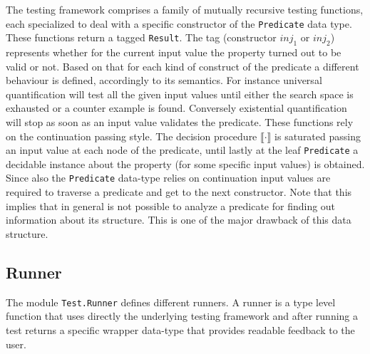 \documentclass[10pt,a4paper]{article}
\begin{document}
The testing framework comprises a family of mutually recursive testing functions, each specialized to deal with a specific constructor of the \texttt{Predicate} data type. These functions return a tagged \texttt{Result}.
The tag (constructor $inj_1$ or $inj_2$) represents whether for the current input value the property turned out to be valid or not.
Based on that for each kind of construct of the predicate a different behaviour is defined, accordingly to its semantics.
For instance universal quantification will test all the given input values until either the search space is exhausted or a counter example is found. Conversely existential quantification will stop as soon as an input value validates the predicate.
These functions rely on the continuation passing style.
The decision procedure $\llbracket \cdot \rrbracket$ is saturated passing an input value at each node of the predicate, until lastly at the leaf \texttt{Predicate} a decidable instance about the property (for some specific input values) is obtained.
Since also the \texttt{Predicate} data-type relies on continuation input values are required to traverse a predicate and get to the next constructor.
Note that this implies that in general is not possible to analyze a predicate for finding out information about its structure. This is one of the major drawback of this data structure.

\subsection{Runner}
The module \texttt{Test.Runner} defines different runners.
A runner is a type level function that uses directly the underlying testing framework and after running a test returns a specific wrapper data-type that provides readable feedback to the user.
\end{document}
